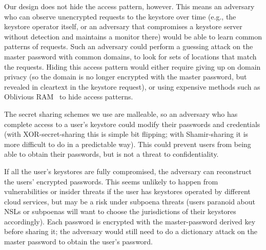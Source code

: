 Our design does not hide the access pattern, however. This means an adversary who can observe unencrypted requests to the keystore over time (e.g., the keystore operator itself, or an adversary that compromises a keystore server without detection and maintains a monitor there) would be able to learn common patterns of requests. Such an adversary could perform a guessing attack on the master password with common domains, to look for sets of locations that match the requests. Hiding this access pattern would either require giving up on domain privacy (so the domain is no longer encrypted with the master password, but revealed in cleartext in the keystore request), or using expensive methods such as Oblivious RAM~\cite{goldreich96} to hide access patterns.


The secret sharing schemes we use are malleable, so an adversary who has complete access to a user's keystore could modify their passwords and credentials (with XOR-secret-sharing this is simple bit flipping; with Shamir-sharing it is more difficult to do in a predictable way). This could prevent users from being able to obtain their passwords, but is not a threat to confidentiality.

 If all the user's keystores are fully compromised, the adversary can reconstruct the users' encrypted passwords. This seems unlikely to happen from vulnerabilities or insider threats if the user has keystores operated by different cloud services, but may be a risk under subpoena threats (users paranoid about NSLs or subpoenas will want to choose the jurisdictions of their keystores accordingly). %
Each password is encrypted with the master-password derived key before sharing it; the adversary would still need to do a dictionary attack on the master password to obtain the user's password. 


